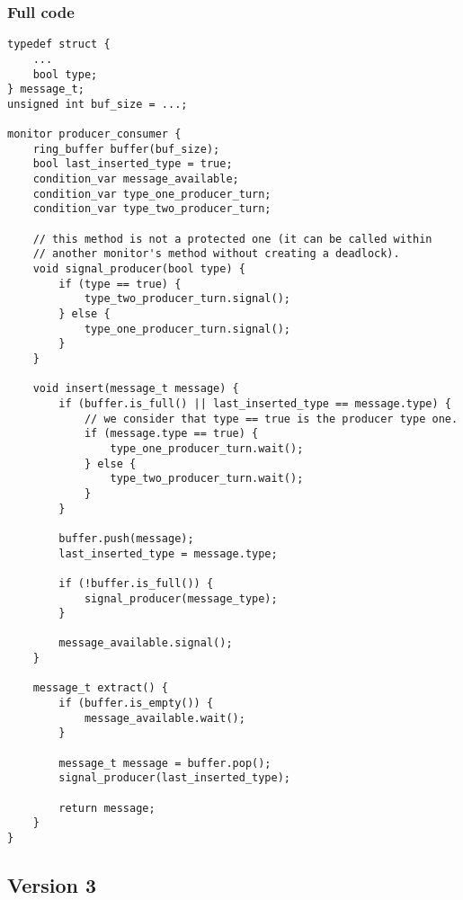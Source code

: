 \documentclass[a4paper, 12pt]{article}
\begin{document}
\pagebreak

\subsubsection{Full code}
\begin{lstlisting}
typedef struct {
    ...
    bool type;
} message_t;
unsigned int buf_size = ...;

monitor producer_consumer {
    ring_buffer buffer(buf_size);
    bool last_inserted_type = true;
    condition_var message_available;
    condition_var type_one_producer_turn;
    condition_var type_two_producer_turn;

    // this method is not a protected one (it can be called within
    // another monitor's method without creating a deadlock).
    void signal_producer(bool type) {
        if (type == true) {
            type_two_producer_turn.signal();
        } else {
            type_one_producer_turn.signal();
        }
    }

    void insert(message_t message) {
        if (buffer.is_full() || last_inserted_type == message.type) {
            // we consider that type == true is the producer type one.
            if (message.type == true) {
                type_one_producer_turn.wait();
            } else {
                type_two_producer_turn.wait();
            }
        }

        buffer.push(message);
        last_inserted_type = message.type;

        if (!buffer.is_full()) {
            signal_producer(message_type);
        }

        message_available.signal();
    }

    message_t extract() {
        if (buffer.is_empty()) {
            message_available.wait();
        }

        message_t message = buffer.pop();
        signal_producer(last_inserted_type);

        return message;
    }
}
\end{lstlisting}

\pagebreak

\subsection{Version 3}
\end{document}

